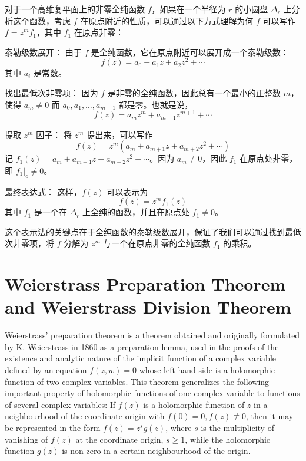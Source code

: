 \documentclass[lang=cn,12pt,fontset=none,a4paper]{beautybook}
\begin{document}
\begin{solution}
   对于一个高维复平面上的非零全纯函数 \( f \)，如果在一个半径为 \( r \) 的小圆盘 \( \Delta_r \) 上分析这个函数，考虑 \( f \) 在原点附近的性质，可以通过以下方式理解为何 \( f \) 可以写作 \( f = z^m f_1 \)，其中 \( f_1 \) 在原点非零：
   
   泰勒级数展开：
   由于 \( f \) 是全纯函数，它在原点附近可以展开成一个泰勒级数：
   \[
      f(z) = a_0 + a_1 z + a_2 z^2 + \cdots
   \]
   其中 \( a_i \) 是常数。
   
   找出最低次非零项：
   因为 \( f \) 是非零的全纯函数，因此总有一个最小的正整数 \( m \)，使得 \( a_m \neq 0 \) 而 \( a_0, a_1, \ldots, a_{m-1} \) 都是零。也就是说，
   \[
      f(z) = a_m z^m + a_{m+1} z^{m+1} + \cdots
   \]
   
   提取 \( z^m \) 因子：
   将 \( z^m \) 提出来，可以写作
   \[
      f(z) = z^m (a_m + a_{m+1} z + a_{m+2} z^2 + \cdots)
   \]
   记 \( f_1(z) = a_m + a_{m+1} z + a_{m+2} z^2 + \cdots \)。因为 \( a_m \neq 0 \)，因此 \( f_1 \) 在原点处非零，即 \( f_1|_o \neq 0 \)。
   
   最终表达式：
   这样，\( f(z) \) 可以表示为
   \[
      f(z) = z^m f_1(z)
   \]
   其中 \( f_1 \) 是一个在 \( \Delta_r \) 上全纯的函数，并且在原点处 \( f_1 \neq 0 \)。
   
   这个表示法的关键点在于全纯函数的泰勒级数展开，保证了我们可以通过找到最低次非零项，将 \( f \) 分解为 \( z^m \) 与一个在原点非零的全纯函数 \( f_1 \) 的乘积。
\end{solution}


\section{Weierstrass Preparation Theorem and Weierstrass Division Theorem}

Weierstrass' preparation theorem is a theorem obtained and originally formulated by K. Weierstrass in 1860 as a preparation lemma, used in the proofs of the existence and analytic nature of the implicit function of a complex variable defined by an equation $f(z,w)=0$ whose left-hand side is a holomorphic function of two complex variables. This theorem generalizes the following important property of holomorphic functions of one complex variable to functions of several complex variables: If $f(z)$ is a holomorphic function of $z$ in a neighbourhood of the coordinate origin with $f(0)=0, f(z)\not\equiv 0$, then it may be represented in the form $f(z)=z^s g(z)$, where $s$ is the multiplicity of vanishing of $f(z)$ at the coordinate origin, $s\geq 1$, while the holomorphic function $g(z)$ is non-zero in a certain neighbourhood of the origin.
\end{document}
